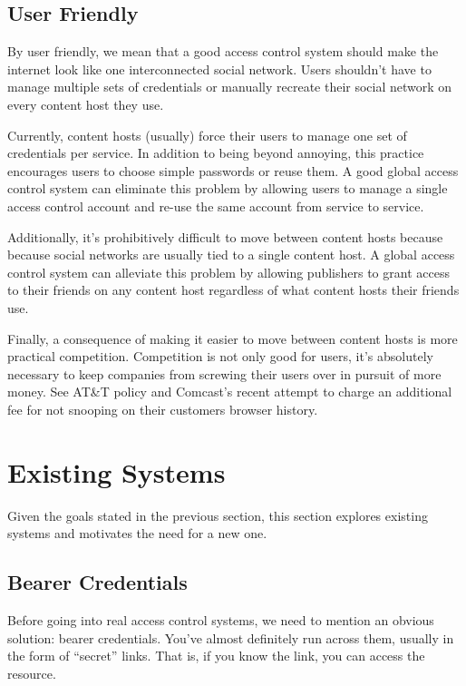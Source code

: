 \documentclass[pdftex,12pt,a4papaer]{report}
\begin{document}
\subsection{User Friendly}
\label{sub:goal-user}

By user friendly, we mean that a good access control system should make the
internet look like one interconnected social network. Users shouldn't have to
manage multiple sets of credentials or manually recreate their social network on
every content host they use.

Currently, content hosts (usually) force their users to manage one set of
credentials per service. In addition to being beyond annoying, this practice
encourages users to choose simple passwords or reuse them. A good global access
control system can eliminate this problem by allowing users to manage a single
access control account and re-use the same account from service to service.

Additionally, it's prohibitively difficult to move between content hosts because
because social networks are usually tied to a single content host. A global
access control system can alleviate this problem by allowing publishers to
grant access to their friends on any content host regardless of what content
hosts their friends use.

Finally, a consequence of making it easier to move between content hosts is
more practical competition. Competition is not only good for users, it's
absolutely necessary to keep companies from screwing their users over in pursuit
of more money. See AT\&T\texttrademark{}\cite{att} policy and
Comcast's\texttrademark{}\cite{comcast} recent attempt to charge an additional
fee for not snooping on their customers browser history.

\section{Existing Systems} 

Given the goals stated in the previous section, this section explores existing
systems and motivates the need for a new one.

\subsection{Bearer Credentials}

Before going into real access control systems, we need to mention an obvious
solution: bearer credentials. You've almost definitely run across them, usually
in the form of ``secret'' links. That is, if you know the link, you can access
the resource.
\end{document}

